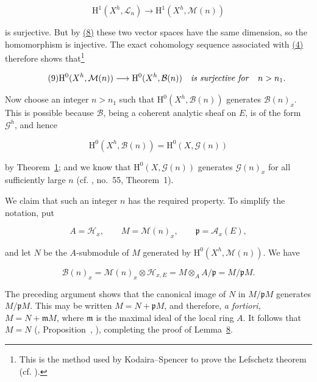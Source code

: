 \begin{equation*}
\mathrm{H}^1(X^h,\mathcal{L}_n)
\longrightarrow
\mathrm{H}^1(X^h,\mathcal{M}(n))
\end{equation*}

is surjective. But by \hyperref[gaga:eq:8]{(8)} these two vector spaces have the same dimension, so the homomorphism is injective. The exact cohomology sequence associated with \hyperref[gaga:eq:4]{(4)} therefore shows that\footnote{This is the method used by Kodaira--Spencer to prove the Lefschetz theorem (cf. ).}

\begin{equation*}\tag{9}
\mathrm{H}^0(X^h,\mathcal{M}(n))
\longrightarrow
\mathrm{H}^0(X^h,\mathcal{B}(n))
\quad\text{\emph{is surjective for}}\quad n>n_1.
\end{equation*}

Now choose an integer $n>n_1$ such that $\mathrm{H}^0(X^h,\mathcal{B}(n))$ generates $\mathcal{B}(n)_x$. This is possible because $\mathcal{B}$, being a coherent analytic sheaf on $E$, is of the form $\mathcal{G}^h$, and hence

\begin{equation*}
\mathrm{H}^0(X^h,\mathcal{B}(n))
=
\mathrm{H}^0(X,\mathcal{G}(n))
\end{equation*}

by Theorem~\hyperref[gaga:thm:1]{1}; and we know that $\mathrm{H}^0(X,\mathcal{G}(n))$ generates $\mathcal{G}(n)_x$ for all sufficiently large $n$ (cf. , no.~55, Theorem~1).

We claim that such an integer $n$ has the required property. To simplify the notation, put

\begin{equation*}
A=\mathcal{H}_x,\qquad M=\mathcal{M}(n)_x,\qquad
\mathfrak{p}=\mathcal{A}_x(E),
\end{equation*}

and let $N$ be the $A$-submodule of $M$ generated by $\mathrm{H}^0(X^h,\mathcal{M}(n))$. We have

\begin{equation*}
\mathcal{B}(n)_x
=\mathcal{M}(n)_x\otimes\mathcal{H}_{x,E}
=M\otimes_A A/\mathfrak{p}
=M/\mathfrak{p}M.
\end{equation*}

The preceding argument shows that the canonical image of $N$ in $M/\mathfrak{p}M$ generates $M/\mathfrak{p}M$. This may be written $M=N+\mathfrak{p}M$, and therefore, \emph{a fortiori}, $M=N+\mathfrak{m}M$, where $\mathfrak{m}$ is the maximal ideal of the local ring $A$. It follows that $M=N$ (, Proposition~, ), completing the proof of Lemma~\hyperref[gaga:lemma:8]{8}.

